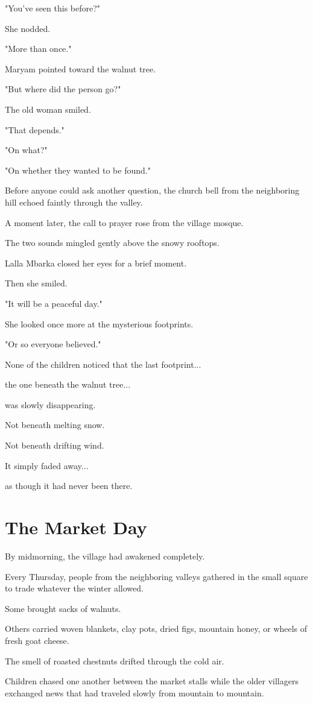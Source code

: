 \documentclass[12pt,openany]{book}
\begin{document}
"You've seen this before?"

She nodded.

"More than once."

Maryam pointed toward the walnut tree.

"But where did the person go?"

The old woman smiled.

"That depends."

"On what?"

"On whether they wanted to be found."

Before anyone could ask another question, the church bell from the neighboring hill echoed faintly through the valley.

A moment later, the call to prayer rose from the village mosque.

The two sounds mingled gently above the snowy rooftops.

Lalla Mbarka closed her eyes for a brief moment.

Then she smiled.

"It will be a peaceful day."

She looked once more at the mysterious footprints.

"Or so everyone believed."

None of the children noticed that the last footprint...

the one beneath the walnut tree...

was slowly disappearing.

Not beneath melting snow.

Not beneath drifting wind.

It simply faded away...

as though it had never been there.
\section*{The Market Day}

By midmorning, the village had awakened completely.

Every Thursday, people from the neighboring valleys gathered in the small square to trade whatever the winter allowed.

Some brought sacks of walnuts.

Others carried woven blankets, clay pots, dried figs, mountain honey, or wheels of fresh goat cheese.

The smell of roasted chestnuts drifted through the cold air.

Children chased one another between the market stalls while the older villagers exchanged news that had traveled slowly from mountain to mountain.
\end{document}

